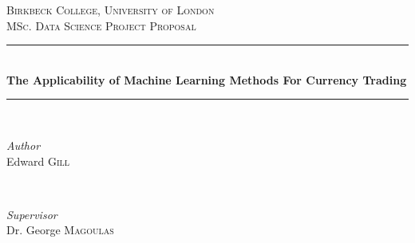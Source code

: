 \documentclass[11pt]{article}
\begin{document}
\begin{titlepage} %
	\newcommand{\HRule}{\rule{\linewidth}{0.5mm}} %
	
	\center %
	
	
	\textsc{\Large Birkbeck College, University of London}\\[1.5cm] %
	
	\textsc{\Large MSc. Data Science Project Proposal}\\[0.5cm] %
		
	
	\HRule\\[0.4cm]
	
	{\huge\bfseries The Applicability of Machine Learning Methods For Currency Trading}\\[0.4cm] %
	
	\HRule\\[1.5cm]
	
	
	\begin{minipage}{0.4\textwidth}
		\begin{flushleft}
			\large
			\textit{Author}\\
			Edward \textsc{Gill} %
		\end{flushleft}
	\end{minipage}
	~
	\begin{minipage}{0.4\textwidth}
		\begin{flushright}
			\large
			\textit{Supervisor}\\
			Dr. George \textsc{Magoulas} %
		\end{flushright}
	\end{minipage}
	
	

\end{titlepage}
\end{document}
